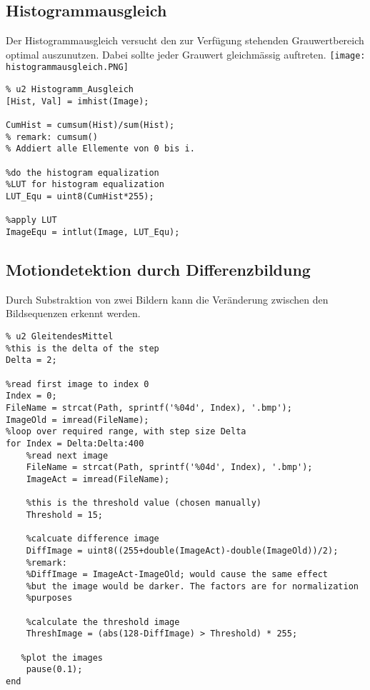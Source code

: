 \subsection{Histogrammausgleich}
Der Histogrammausgleich versucht den zur Verfügung stehenden Grauwertbereich optimal auszunutzen. Dabei sollte jeder Grauwert gleichmässig auftreten.
\texttt{[image: histogrammausgleich.PNG]}
\begin{lstlisting}
% u2 Histogramm_Ausgleich
[Hist, Val] = imhist(Image);

CumHist = cumsum(Hist)/sum(Hist);
% remark: cumsum()
% Addiert alle Ellemente von 0 bis i.

%do the histogram equalization
%LUT for histogram equalization
LUT_Equ = uint8(CumHist*255);

%apply LUT
ImageEqu = intlut(Image, LUT_Equ);
\end{lstlisting}

\subsection{Motiondetektion durch Differenzbildung}
Durch Substraktion von zwei Bildern kann die Veränderung zwischen den Bildsequenzen erkennt werden.
\begin{lstlisting}
% u2 GleitendesMittel   
%this is the delta of the step
Delta = 2;

%read first image to index 0
Index = 0;
FileName = strcat(Path, sprintf('%04d', Index), '.bmp');
ImageOld = imread(FileName);
%loop over required range, with step size Delta
for Index = Delta:Delta:400
    %read next image
    FileName = strcat(Path, sprintf('%04d', Index), '.bmp');
    ImageAct = imread(FileName);
    
    %this is the threshold value (chosen manually)
    Threshold = 15;
    
    %calcuate difference image
    DiffImage = uint8((255+double(ImageAct)-double(ImageOld))/2);
    %remark:
    %DiffImage = ImageAct-ImageOld; would cause the same effect
    %but the image would be darker. The factors are for normalization
    %purposes

    %calculate the threshold image
    ThreshImage = (abs(128-DiffImage) > Threshold) * 255;
    
   %plot the images
    pause(0.1);
end
\end{lstlisting}
